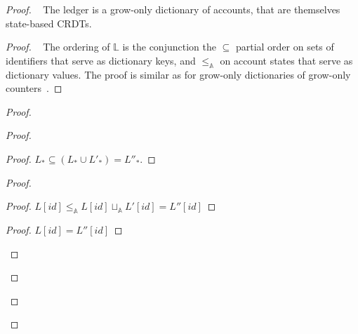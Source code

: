 \documentclass[9pt, oneside]{article}   	%
\begin{document}
\label{th:ledger-crdt}
\begin{proof}
	\pfsketch~ The ledger is a grow-only dictionary of accounts, that are themselves state-based CRDTs.
	
	\begin{proof}
		\pfsketch~ The ordering of $\mathds{L}$ is the conjunction the $\subseteq$ partial order on sets of identifiers that serve as dictionary keys, and $\leq_\mathds{A}$ on account states that serve as dictionary values. The proof is similar as for grow-only dictionaries of grow-only counters~\cite{lavoie2023statebased}.
	\end{proof}
	
	\begin{proof}		
		\begin{proof}
			\begin{proof}
				$L_* \subseteq (L_* \cup L'_*) = L''_*$.
			\end{proof}
			
			\begin{proof}
				\begin{proof}
					$ L[\textit{id}] \leq_\mathds{A} L[\textit{id}] \sqcup_\mathds{A}  L'[\textit{id}]  = L''[\textit{id}]$
				\end{proof}
				
				\begin{proof}
					$L[\textit{id}] = L''[\textit{id}]$
				\end{proof}
			\end{proof}
			

\end{proof}
\end{proof}
\end{proof}
\end{document}
